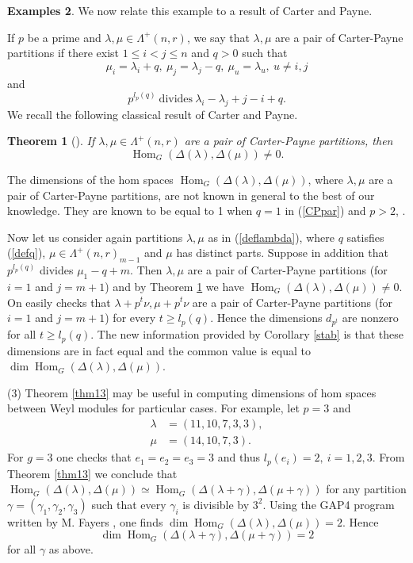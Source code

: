 \documentclass[11pt]{article}
\newtheorem{theo}{Theorem}[section]
\theoremstyle{definition}
\newtheorem{exams}[theo]{Examples}
\numberwithin{equation}{section}
\newcommand{\la}{\lambda}
\newcommand{\La}{\Lambda}
\DeclareMathOperator{\Hom}{Hom}
\numberwithin{equation}{section}
\begin{document}
\begin{exams}
	We now relate this example to a result of Carter and Payne.
	
	If $p$ be a prime and $\lambda, \mu \in \La^+(n,r)$, we say that $\lambda, \mu$ are a pair of Carter-Payne partitions if there exist $1 \le i<j \le n$ and $q>0$ such that \begin{equation}\label{CPpar}\mu_i=\lambda_i +q, \ \mu_j=\lambda_j -q, \ \mu_u=\lambda_u, \ u \neq i,j \end{equation}
	and \begin{equation}\label{CPdiv} p^{l_p(q)} \ \textrm{divides} \ \lambda_i-\lambda_j +j-i+q.
	\end{equation}
	We recall the following classical result of Carter and Payne.
	\begin{theo}[{\cite{CP}}]\label{CPthm}
If $\lambda, \mu \in \La^+(n,r)$ are a pair of Carter-Payne partitions, then \[\Hom_G(\Delta(\lambda), \Delta(\mu)) \neq 0.\]
	\end{theo}
	The dimensions of the hom spaces $\Hom_G(\Delta(\lambda), \Delta(\mu))$, where $\lambda, \mu$ are a pair of Carter-Payne partitions, are not known in general to the best of our knowledge. They are known to be equal to 1 when $q=1$ in (\ref{CPpar}) and $p>2$, \cite{EM}.
	
	Now let us consider again partitions $\lambda,  \mu $ as  in (\ref{deflambda}), where $q$ satisfies (\ref{defq}), $\mu \in \La^+(n,r)_{m-1}$ and $\mu$ has distinct parts. Suppose in addition that $p^{l_p(q)}$ divides $\mu_1-q+m$. Then $\lambda, \mu$ are a pair of Carter-Payne partitions (for $i=1$ and $j=m+1$) and by Theorem \ref{CPthm} we have $\Hom_G(\Delta(\lambda), \Delta(\mu)) \neq 0$. On easily checks that $\lambda +p^t\nu, \mu +p^t\nu$ are a pair of Carter-Payne partitions (for $i=1$ and $j=m+1$) for every $t \ge l_p(q)$. Hence the dimensions $d_{p^t}$ are nonzero for all $ t \ge l_p(q)$. The new information provided by Corollary \ref{stab} is that these dimensions are in fact equal and the common value is equal to $\dim \Hom_G(\Delta(\la),\Delta(\mu)).$
	
	(3) Theorem \ref{thm13} may be useful in computing dimensions of hom spaces between Weyl modules for particular cases. For example, let $p=3$ and \begin{align*}\lambda&=(11, 10, 7, 3, 3), \\ \mu &=(14, 10, 7, 3). \end{align*} For $g=3$ one checks that  $e_1=e_2=e_3=3$ and thus $l_p(e_i)=2, \ i=1,2,3$. From Theorem \ref{thm13} we conclude that $\Hom_G(\Delta(\la),\Delta(\mu)) \simeq \Hom_{G}(\Delta(\la+\gamma), \Delta(\mu+\gamma))$ for any partition $\gamma = (\gamma_1, \gamma_2, \gamma_3)$ such that every $\gamma_i$ is divisible by $3^2$. Using the GAP4 program written by M. Fayers \cite{FGAP}, one finds $\dim\Hom_G(\Delta(\lambda), \Delta(\mu))=2.$ Hence \[\dim\Hom_G(\Delta(\lambda +\gamma), \Delta(\mu + \gamma))=2\] for all  $\gamma$ as above.


\end{exams}
\end{document}
